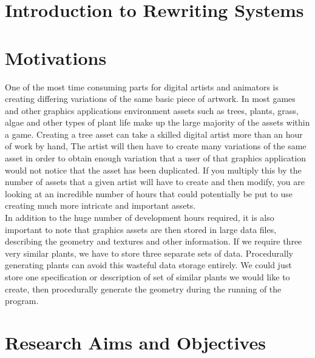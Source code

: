 \begin{flushleft}



\end{flushleft}

\section{Introduction to Rewriting Systems}

\section{Motivations}
 
\begin{flushleft}
One of the most time consuming parts for digital artists and animators is creating differing variations of the same basic piece of artwork. In most games and other graphics applications environment assets such as trees, plants, grass, algae and other types of plant life make up the large majority of the assets within a game. Creating a tree asset can take a skilled digital artist more than an hour of work by hand, The artist will then have to create many variations of the same asset in order to obtain enough variation that a user of that graphics application would not notice that the asset has been duplicated. If you multiply this by the number of assets that a given artist will have to create and then modify, you are looking at an incredible number of hours that could potentially be put to use creating much more intricate and important assets.\\
\vspace{5mm}
In addition to the huge number of development hours required, it is also important to note that graphics assets are then stored in large data files, describing the geometry and textures and other information. If we require three very similar plants, we have to store three separate sets of data. Procedurally generating plants can avoid this wasteful data storage entirely. We could just store one specification or description of set of similar plants we would like to create, then procedurally generate the geometry during the running of the program.\\
\end{flushleft}

\section{Research Aims and Objectives}

